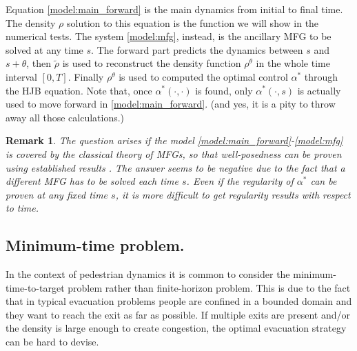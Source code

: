 \documentclass{cmslatex}
\newcommand{\alphastar}{\alpha^*}
\newcommand{\rtheta}{\rho^\theta}
\renewcommand{\r}{\rho}
\newcommand{\TODO}[1]{\textcolor{red}{#1}}
\newtheorem{rem}[thm]{Remark}
\begin{document}
%
Equation \eqref{model:main_forward} is the main dynamics from initial to final time. 
The density $\r$ solution to this equation is the function we will show in the numerical tests.
The system \eqref{model:mfg}, instead, is the ancillary MFG to be solved at any time $s$. The forward part predicts the dynamics between $s$ and $s+\theta$, then $\tilde \r$ is used to reconstruct the density function $\rtheta$ in the whole time interval $[0,T]$. 
Finally $\rtheta$ is used to computed the optimal control $\alphastar$ through the HJB equation. 
Note that, once $\alphastar(\cdot,\cdot)$ is found, only $\alphastar(\cdot,s)$ is actually used to move forward in \eqref{model:main_forward}. (and yes, it is a pity to throw away all those calculations.)

\medskip

\begin{rem}\label{rem:theroeticalinsights}
The question arises if the model \eqref{model:main_forward}-\eqref{model:mfg} is covered by the classical theory of MFGs, so that well-posedness can be proven using established results \cite{lasry2007}. 
The answer seems to be negative due to the fact that a different MFG has to be solved each time $s$. 
Even if the regularity of $\alphastar$ can be proven at any \textit{fixed} time $s$, it is more difficult to get regularity results with respect to time. 
\end{rem}

\subsection{Minimum-time problem.}
In the context of pedestrian dynamics it is common to consider the minimum-time-to-target problem rather than finite-horizon problem. 
This is due to the fact that in typical evacuation problems people are confined in a bounded domain and they want to reach the exit as far as possible. If multiple exits are present and/or the density is large enough to create congestion, the optimal evacuation strategy can be hard to devise.
\end{document}
